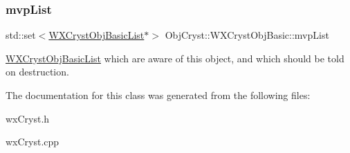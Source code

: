 \subsubsection{\texorpdfstring{mvpList}{mvpList}}
{\footnotesize\ttfamily std\+::set$<$\mbox{\hyperlink{class_obj_cryst_1_1_w_x_cryst_obj_basic_list}{W\+X\+Cryst\+Obj\+Basic\+List}}$\ast$$>$ Obj\+Cryst\+::\+W\+X\+Cryst\+Obj\+Basic\+::mvp\+List\hspace{0.3cm}{\ttfamily [protected]}}

\mbox{\hyperlink{class_obj_cryst_1_1_w_x_cryst_obj_basic_list}{W\+X\+Cryst\+Obj\+Basic\+List}} which are aware of this object, and which should be told on destruction. 

The documentation for this class was generated from the following files\+:\begin{DoxyCompactItemize}
\item 
wx\+Cryst.\+h\item 
wx\+Cryst.\+cpp\end{DoxyCompactItemize}
